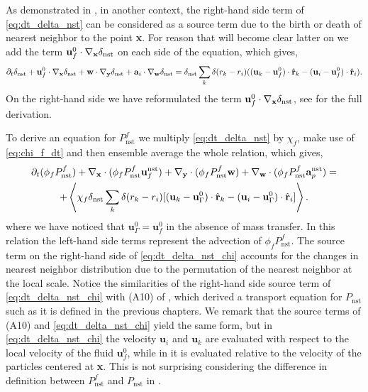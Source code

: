 As demonstrated in \citet{zhang2023evolution}, in another context, the right-hand side term of \ref{eq:dt_delta_nst} can be considered as a source term due to the birth or death of nearest neighbor to the point \textbf{x}. 
For reason that will become clear latter on we add the term $\textbf{u}_f^0\cdot {\mathbf{\nabla}_\textbf{x}} \delta_\text{nst}$ on each side of the equation, which gives,
\begin{equation}
    \pddt \delta_\text{nst}
    + \textbf{u}_f^0\cdot \pddx \delta_\text{nst}
    + \textbf{w}   \cdot \pddy \delta_\text{nst}
    + \textbf{a}_i \cdot \pddw   \delta_\text{nst}
    = 
    \delta_\text{nst}
    \sum_k 
    \delta(r_k - r_i)
    ((\textbf{u}_k - \textbf{u}_f^0) \cdot \hat{\textbf{r}}_k - (\textbf{u}_i  - \textbf{u}_f^0)\cdot \hat{\textbf{r}}_i). 
    \label{eq:dt_delta_nst}
\end{equation}
On the right-hand side we have reformulated the term $\textbf{u}_f^0\cdot {\mathbf{\nabla}_\textbf{x}} \delta_\text{nst}$, see  for the full derivation. 

To derive an equation for $P_\text{nst}^f$ we multiply \ref{eq:dt_delta_nst} by $\chi_f$, make use of \ref{eq:chi_f_dt} and then ensemble average the whole relation, which gives,
\begin{multline}
    \pddt (\phi_fP_\text{nst}^f)
    + 
    \pddx \cdot (
        \phi_f 
        P_\text{nst}^f
        \textbf{u}_f^\text{nst}
    )
    + \pddy \cdot (
        \phi_f
        P_\text{nst}^f
        \textbf{w} 
    )
    +
    \pddw \cdot (  
        \phi_f 
        P_\text{nst}^f
        \textbf{a}_p^\text{nst} 
    )
    = \\
    + \avg{
     \chi_f \delta_\text{nst}
    \sum_k 
    \delta(r_k - r_i)
    [(\textbf{u}_k - \textbf{u}_\Gamma^0) \cdot \hat{\textbf{r}}_k - (\textbf{u}_i- \textbf{u}_\Gamma^0)  \cdot \hat{\textbf{r}}_i]}.
    \label{eq:dt_P_nst_chi}
\end{multline}
where we have noticed that $\textbf{u}_\Gamma^0 = \textbf{u}_f^0$ in the absence of mass transfer. 
In this relation the left-hand side terms represent the advection of $\phi_f P_\text{nst}^f$.
The source term on the right-hand side of \ref{eq:dt_delta_nst_chi} accounts for the changes in nearest neighbor distribution due to the permutation of the nearest neighbor at the local scale. 
Notice the similarities of the right-hand side source term of \ref{eq:dt_delta_nst_chi} with (A10) of \citet{zhang2023evolution}, which derived a transport equation for $P_\text{nst}$ such as it is defined in the previous chapters. 
We remark that the source terms of (A10) and \ref{eq:dt_delta_nst_chi} yield the same form, but in \ref{eq:dt_delta_nst_chi} the velocity $\textbf{u}_i$ and $\textbf{u}_k$ are evaluated with respect to the local velocity of the fluid $\textbf{u}_f^0$, while in \citet{zhang2023evolution} it is evaluated relative to the velocity of the particles centered at \textbf{x}. 
This is not surprising considering the difference in definition between $P_\text{nst}^f$ and $P_\text{nst}$ in \citet{zhang2023evolution}. 


